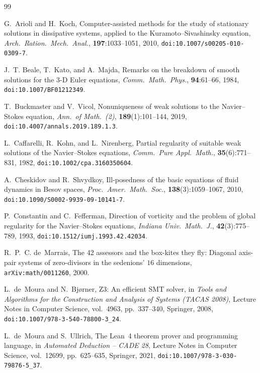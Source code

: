 \documentclass[11pt]{article}
\theoremstyle{plain}
\theoremstyle{definition}
\begin{document}
\begin{thebibliography}{99}

G.~Arioli and H.~Koch,
Computer-assisted methods for the study of stationary solutions in dissipative systems, applied to the Kuramoto--Sivashinsky equation,
\emph{Arch.\ Ration.\ Mech.\ Anal.}, \textbf{197}:1033--1051, 2010, \texttt{doi:10.1007/s00205-010-0309-7}.

J.~T. Beale, T.~Kato, and A.~Majda,
Remarks on the breakdown of smooth solutions for the 3-D Euler equations,
\emph{Comm.\ Math.\ Phys.}, \textbf{94}:61--66, 1984, \texttt{doi:10.1007/BF01212349}.

T.~Buckmaster and V.~Vicol,
Nonuniqueness of weak solutions to the Navier--Stokes equation,
\emph{Ann.\ of Math.\ (2)}, \textbf{189}(1):101--144, 2019, \texttt{doi:10.4007/annals.2019.189.1.3}.

L.~Caffarelli, R.~Kohn, and L.~Nirenberg,
Partial regularity of suitable weak solutions of the Navier--Stokes equations,
\emph{Comm.\ Pure Appl.\ Math.}, \textbf{35}(6):771--831, 1982, \texttt{doi:10.1002/cpa.3160350604}.

A.~Cheskidov and R.~Shvydkoy,
Ill-posedness of the basic equations of fluid dynamics in Besov spaces,
\emph{Proc.\ Amer.\ Math.\ Soc.}, \textbf{138}(3):1059--1067, 2010, \texttt{doi:10.1090/S0002-9939-09-10141-7}.

P.~Constantin and C.~Fefferman,
Direction of vorticity and the problem of global regularity for the Navier--Stokes equations,
\emph{Indiana Univ.\ Math.\ J.}, \textbf{42}(3):775--789, 1993, \texttt{doi:10.1512/iumj.1993.42.42034}.

R.~P.~C. de~Marrais,
The 42 assessors and the box-kites they fly: Diagonal axis-pair systems of zero-divisors in the sedenions' $16$ dimensions,
\texttt{arXiv:math/0011260}, 2000.

L.~de~Moura and N.~Bj{\o}rner,
Z3: An efficient SMT solver,
in \emph{Tools and Algorithms for the Construction and Analysis of Systems (TACAS 2008)}, Lecture Notes in Computer Science, vol.~4963, pp.~337--340, Springer, 2008, \texttt{doi:10.1007/978-3-540-78800-3\_24}.

L.~de~Moura and S.~Ullrich,
The Lean~4 theorem prover and programming language,
in \emph{Automated Deduction -- CADE 28}, Lecture Notes in Computer Science, vol.~12699, pp.~625--635, Springer, 2021, \texttt{doi:10.1007/978-3-030-79876-5\_37}.


\end{thebibliography}
\end{document}
